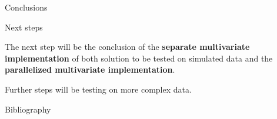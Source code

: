 \documentclass{beamer}
\begin{document}
\begin{section}{Conclusions}
	
    \begin{frame}[plain]{}
		\sectionpage
	\end{frame}

	\begin{frame}{Next steps}
	
		The next step will be the conclusion of the \textbf{separate multivariate implementation} of both solution to be tested on simulated data and the \textbf{parallelized multivariate implementation}.
		
		\vspace{0.5 cm}
		Further steps will be testing on more complex data.
	\end{frame}

	\begin{frame}{Bibliography}
		\nocite{*}
		
		\tiny{  }

	

	\end{frame}
\end{section}
\end{document}
